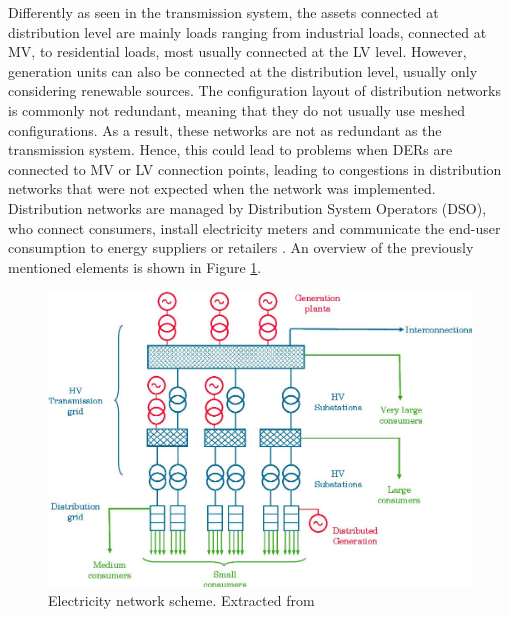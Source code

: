 Differently as seen in the transmission system, the assets connected at distribution level are mainly loads ranging from industrial loads, connected at MV, to residential loads, most usually connected at the LV level. However, generation units can also be connected  at the distribution level, usually only considering renewable sources. The configuration layout of distribution networks is commonly not redundant, meaning that they do not usually use meshed configurations. As a result, these networks are not as redundant as the transmission system. Hence, this could lead to problems when DERs are connected to MV or LV connection points, leading to congestions  in distribution networks that were not expected when the network was implemented. Distribution networks are managed by Distribution System Operators (DSO), who connect consumers, install electricity meters and communicate the end-user consumption to energy suppliers or retailers \cite{Erbach2016}. An overview of the previously mentioned elements is shown in Figure \ref{fig:networkscheme}. 


\begin{figure}[htbp]
	\centering 
	\includegraphics[width=0.6\columnwidth ]{ChapterIntro/Figures/ELECTRICITY_SYSTEM.jpg}
		\caption{Electricity network scheme. Extracted from \cite{Erbach2016}}  
		\label{fig:networkscheme}
\end{figure}


